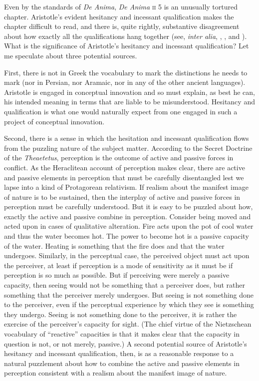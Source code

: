 Even by the standards of \emph{De Anima}, \emph{De Anima} \textsc{ii} 5 is an unusually tortured chapter. Aristotle's evident hesitancy and incessant qualification makes the chapter difficult to read, and there is, quite rightly, substantive disagreement about how exactly all the qualifications hang together (see, \emph{inter alia}, \citealt{Burnyeat:2002an}, \citealt{Heinaman:2007ys}, and \citealt{Bowin:2011uq}). What is the significance of Aristotle's hesitancy and incessant qualification? Let me speculate about three potential sources. 

First, there is not in Greek the vocabulary to mark the distinctions he needs to mark (nor in Persian, nor Aramaic, nor in any of the other ancient languages). Aristotle is engaged in conceptual innovation and so must explain, as best he can, his intended meaning in terms that are liable to be misunderstood. Hesitancy and qualification is what one would naturally expect from one engaged in such a project of conceptual innovation. 

Second, there is a sense in which the hesitation and incessant qualification flows from the puzzling nature of the subject matter. According to the Secret Doctrine of the \emph{Theaetetus}, perception is the outcome of active and passive forces in conflict. As the Heraclitean account of perception makes clear, there are active and passive elements in perception that must be carefully disentangled lest we lapse into a kind of Protagorean relativism. If realism about the manifest image of nature is to be sustained, then the interplay of active and passive forces in perception must be carefully understood. But it is easy to be puzzled about how, exactly the active and passive combine in perception. Consider being moved and acted upon in cases of qualitative alteration. Fire acts upon the pot of cool water and thus the water becomes hot. The power to become hot is a passive capacity of the water. Heating is something that the fire does and that the water undergoes. Similarly, in the perceptual case, the perceived object must act upon the perceiver, at least if perception is a mode of sensitivity as it must be if perception is so much as possible. But if perceiving were merely a passive capacity, then seeing would not be something that a perceiver does, but rather something that the perceiver merely undergoes. But seeing is not something done to the perceiver, even if the perceptual experience by which they see is something they undergo. Seeing is not something done to the perceiver, it is rather the exercise of the perceiver's capacity for sight. (The chief virtue of the Nietzschean vocabulary of ``reactive'' capacities is that it makes clear that the capacity in question is not, or not merely, passive.) A second potential source of Aristotle's hesitancy and incessant qualification, then, is as a reasonable response to a natural puzzlement about how to combine the active and passive elements in perception consistent with a realism about the manifest image of nature.

